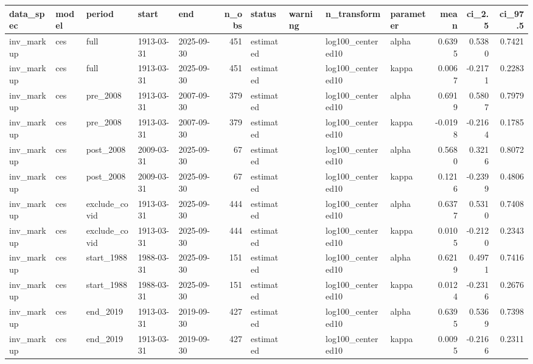 \begin{tabular}{lllllrllllrrr}
\toprule
data\_spec & model & period & start & end & n\_obs & status & warning & n\_transform & parameter & mean & ci\_2.5 & ci\_97.5 \\
\midrule
inv\_markup & ces & full & 1913-03-31 & 2025-09-30 & 451 & estimated &  & log100\_centered10 & alpha & 0.6395 & 0.5380 & 0.7421 \\
inv\_markup & ces & full & 1913-03-31 & 2025-09-30 & 451 & estimated &  & log100\_centered10 & kappa & 0.0067 & -0.2171 & 0.2283 \\
inv\_markup & ces & pre\_2008 & 1913-03-31 & 2007-09-30 & 379 & estimated &  & log100\_centered10 & alpha & 0.6919 & 0.5807 & 0.7979 \\
inv\_markup & ces & pre\_2008 & 1913-03-31 & 2007-09-30 & 379 & estimated &  & log100\_centered10 & kappa & -0.0198 & -0.2164 & 0.1785 \\
inv\_markup & ces & post\_2008 & 2009-03-31 & 2025-09-30 & 67 & estimated &  & log100\_centered10 & alpha & 0.5680 & 0.3216 & 0.8072 \\
inv\_markup & ces & post\_2008 & 2009-03-31 & 2025-09-30 & 67 & estimated &  & log100\_centered10 & kappa & 0.1216 & -0.2399 & 0.4806 \\
inv\_markup & ces & exclude\_covid & 1913-03-31 & 2025-09-30 & 444 & estimated &  & log100\_centered10 & alpha & 0.6377 & 0.5310 & 0.7408 \\
inv\_markup & ces & exclude\_covid & 1913-03-31 & 2025-09-30 & 444 & estimated &  & log100\_centered10 & kappa & 0.0105 & -0.2120 & 0.2343 \\
inv\_markup & ces & start\_1988 & 1988-03-31 & 2025-09-30 & 151 & estimated &  & log100\_centered10 & alpha & 0.6219 & 0.4971 & 0.7416 \\
inv\_markup & ces & start\_1988 & 1988-03-31 & 2025-09-30 & 151 & estimated &  & log100\_centered10 & kappa & 0.0124 & -0.2316 & 0.2676 \\
inv\_markup & ces & end\_2019 & 1913-03-31 & 2019-09-30 & 427 & estimated &  & log100\_centered10 & alpha & 0.6395 & 0.5369 & 0.7398 \\
inv\_markup & ces & end\_2019 & 1913-03-31 & 2019-09-30 & 427 & estimated &  & log100\_centered10 & kappa & 0.0095 & -0.2166 & 0.2311 \\
\bottomrule
\end{tabular}
